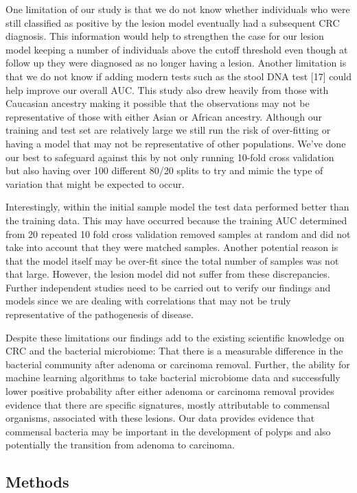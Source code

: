 \documentclass[12pt,]{article}
\begin{document}
One limitation of our study is that we do not know whether individuals
who were still classified as positive by the lesion model eventually had
a subsequent CRC diagnosis. This information would help to strengthen
the case for our lesion model keeping a number of individuals above the
cutoff threshold even though at follow up they were diagnosed as no
longer having a lesion. Another limitation is that we do not know if
adding modern tests such as the stool DNA test {[}17{]} could help
improve our overall AUC. This study also drew heavily from those with
Caucasian ancestry making it possible that the observations may not be
representative of those with either Asian or African ancestry. Although
our training and test set are relatively large we still run the risk of
over-fitting or having a model that may not be representative of other
populations. We've done our best to safeguard against this by not only
running 10-fold cross validation but also having over 100 different
80/20 splits to try and mimic the type of variation that might be
expected to occur.

Interestingly, within the initial sample model the test data performed
better than the training data. This may have occurred because the
training AUC determined from 20 repeated 10 fold cross validation
removed samples at random and did not take into account that they were
matched samples. Another potential reason is that the model itself may
be over-fit since the total number of samples was not that large.
However, the lesion model did not suffer from these discrepancies.
Further independent studies need to be carried out to verify our
findings and models since we are dealing with correlations that may not
be truly representative of the pathogenesis of disease.

Despite these limitations our findings add to the existing scientific
knowledge on CRC and the bacterial microbiome: That there is a
measurable difference in the bacterial community after adenoma or
carcinoma removal. Further, the ability for machine learning algorithms
to take bacterial microbiome data and successfully lower positive
probability after either adenoma or carcinoma removal provides evidence
that there are specific signatures, mostly attributable to commensal
organisms, associated with these lesions. Our data provides evidence
that commensal bacteria may be important in the development of polyps
and also potentially the transition from adenoma to carcinoma.

\newpage

\subsection{Methods}\label{methods}
\end{document}
